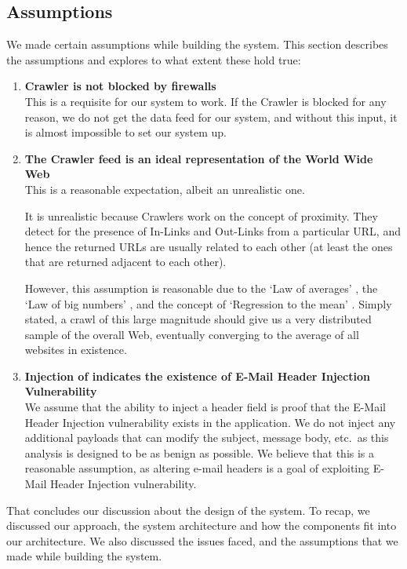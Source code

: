 \subsection{Assumptions}
We made certain assumptions while building the system. This section describes the assumptions and explores to what extent these hold true:
\begin{enumerate}
	\item \textbf{Crawler is not blocked by firewalls}\\
	This is a requisite for our system to work. If the Crawler is blocked for any reason, we do not get the data feed for our system, and without this input, it is almost impossible to set our system up.
	\item \textbf{The Crawler feed is an ideal representation of the World Wide Web} \\
	This is a reasonable expectation, albeit an unrealistic one.
	
	It is unrealistic because Crawlers work on the concept of proximity. They detect for the presence of In-Links and Out-Links from a particular URL, and hence the returned URLs are usually related to each other (at least the ones that are returned adjacent to each other).
	
	However, this assumption is reasonable due to the `Law of averages' \cite{wiki:Law_of_averages}, the `Law of big numbers' \cite{wiki:Law_of_large_numbers}, and the concept of `Regression to the mean' \cite{wiki:Regression_toward_the_mean}. Simply stated, a crawl of this large magnitude should give us a very distributed sample of the overall Web, eventually converging to the average of all websites in existence.
	
	\item \textbf{Injection of  indicates the existence of E-Mail Header Injection Vulnerability} \\
	We assume that the ability to inject a  header field is proof that the E-Mail Header Injection vulnerability exists in the application. We do not inject any additional payloads that can modify the subject, message body, etc.\ as this analysis is designed to be as benign as possible.
	We believe that this is a reasonable assumption, as altering e-mail headers is a goal of exploiting E-Mail Header Injection vulnerability.
\end{enumerate}

That concludes our discussion about the design of the system. To recap, we discussed our approach, the system architecture and how the components fit into our architecture. We also discussed the issues faced, and the assumptions that we made while building the system. %